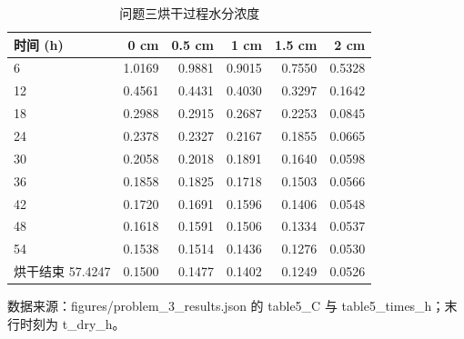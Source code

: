 \begin{table}[H]
  \centering
  \caption{问题三烘干过程水分浓度}
  \label{tab:q3_C}
  \begin{tabular}{lrrrrr}
    \toprule
    时间 (h) & 0 cm & 0.5 cm & 1 cm & 1.5 cm & 2 cm \\
    \midrule
    6 & 1.0169 & 0.9881 & 0.9015 & 0.7550 & 0.5328 \\
    12 & 0.4561 & 0.4431 & 0.4030 & 0.3297 & 0.1642 \\
    18 & 0.2988 & 0.2915 & 0.2687 & 0.2253 & 0.0845 \\
    24 & 0.2378 & 0.2327 & 0.2167 & 0.1855 & 0.0665 \\
    30 & 0.2058 & 0.2018 & 0.1891 & 0.1640 & 0.0598 \\
    36 & 0.1858 & 0.1825 & 0.1718 & 0.1503 & 0.0566 \\
    42 & 0.1720 & 0.1691 & 0.1596 & 0.1406 & 0.0548 \\
    48 & 0.1618 & 0.1591 & 0.1506 & 0.1334 & 0.0537 \\
    54 & 0.1538 & 0.1514 & 0.1436 & 0.1276 & 0.0530 \\
    烘干结束 57.4247 & 0.1500 & 0.1477 & 0.1402 & 0.1249 & 0.0526 \\
    \bottomrule
  \end{tabular}
  \par\vspace{2pt}\footnotesize 数据来源：figures/problem\_3\_results.json 的 table5\_C 与 table5\_times\_h；末行时刻为 t\_dry\_h。
\end{table}
